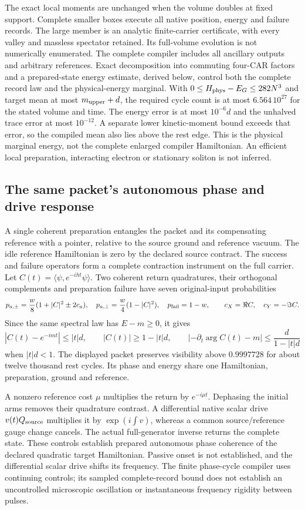 The exact local moments are unchanged when the volume doubles at fixed
support. Complete smaller boxes execute all native position, energy and
failure records. The large member is an analytic finite-carrier certificate,
with every valley and massless spectator retained. Its full-volume evolution
is not numerically enumerated. The complete compiler includes all ancillary
outputs and arbitrary references. Exact decomposition into commuting
four-CAR factors and a prepared-state energy estimate, derived below,
control both the complete record law and the physical-energy marginal.
With $0\le H_{\rm phys}-E_G\le282N^3$ and target mean at most
$m_{\rm upper}+d$, the required cycle count is at most
$6.564\,10^{27}$ for the stated volume and time. The energy error is
at most $10^{-6}d$ and the unhalved trace error at most $10^{-12}$.
A separate lower kinetic-moment bound exceeds that error, so the compiled
mean also lies above the rest edge. This is the physical marginal energy,
not the complete enlarged compiler Hamiltonian. An efficient local
preparation, interacting electron or stationary soliton is not inferred.

\subsection{The same packet's autonomous phase and drive response}

A single coherent preparation entangles the packet and its compensating
reference with a pointer, relative to the source ground and reference
vacuum. The idle reference Hamiltonian is zero by the declared source
contract. The success and failure operators form a complete contraction
instrument on the full carrier. Let
$C(t)=\langle\psi,e^{-iht}\psi\rangle$. Two coherent return quadratures,
their orthogonal complements and preparation failure have seven
original-input probabilities
\[
 p_{a,\pm}=\frac w8(1+|C|^2\pm2c_a),\quad
 p_{a,\perp}=\frac w4(1-|C|^2),\quad p_{\rm fail}=1-w,
 \qquad c_X=\Re C,\quad c_Y=-\Im C.
\]
Since the same spectral law has $E-m\ge0$, it gives
\[
 |C(t)-e^{-imt}|\le |t|d,\qquad |C(t)|\ge1-|t|d,
 \qquad
 \left|-\partial_t\arg C(t)-m\right|\le\frac d{1-|t|d}
\]
when $|t|d<1$. The displayed packet preserves visibility above $0.9997728$
for about twelve thousand rest cycles. Its phase and energy share one
Hamiltonian, preparation, ground and reference.

A nonzero reference cost $\mu$ multiplies the return by $e^{-i\mu t}$.
Dephasing the initial arms removes their quadrature contrast. A differential
native scalar drive $v(t)Q_{\rm source}$ multiplies it by
$\exp(i\int v)$, whereas a common source/reference gauge change cancels.
The actual full-generator inverse returns the complete state. These
controls establish prepared autonomous phase coherence of the declared
quadratic target Hamiltonian. Passive onset is not established, and the
differential scalar drive shifts its frequency. The finite phase-cycle
compiler uses continuing controls; its sampled complete-record bound
does not establish an uncontrolled microscopic oscillation or
instantaneous frequency rigidity between pulses.

